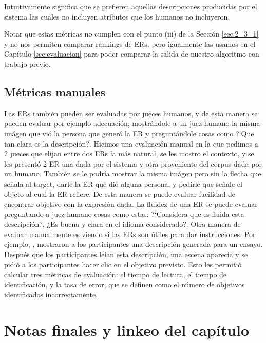 Intuitivamente significa que se prefieren aquellas descripciones producidas por el sistema las cuales no incluyen atributos que los humanos no incluyeron.

Notar que estas m\'etricas no cumplen con el punto (iii) de la Secci\'on \ref{sec:2_3_1} y no nos permiten comparar rankings de ERs, pero igualmente las usamos en el Cap\'itulo \ref{sec:evaluacion} para poder comparar la salida de nuestro algoritmo con trabajo previo.

\subsection{M\'etricas manuales}

Las ERs tambi\'en pueden ser evaluadas por jueces humanos, y de esta manera se pueden evaluar por ejemplo adecuaci\'on, mostr\'andole a un juez humano la misma im\'agen que vi\'o la persona que gener\'o la ER y pregunt\'andole cosas como ?`Que tan clara es la descripci\'on?.
Hicimos una evaluaci\'on manual en la que pedimos a 2 jueces que elijan entre dos ERs la m\'as natural, se les mostro el contexto, y se les present\'o 2 ER una dada por el sistema y otra proveniente del corpus dada por un humano. Tambi\'en se le podr\'ia mostrar la misma im\'agen pero sin la flecha que se\~nala al target, darle la ER que di\'o alguna persona, y pedirle que se\~nale el objeto al cual la ER refiere. De esta manera se puede evaluar facilidad de encontrar objetivo con la expresi\'on dada.
La fluidez de una ER se puede evaluar preguntando a juez humano cosas como estas: 
?`Considera que es fluida esta descripci\'on?, ¿Es buena y clara en el idioma considerado?. 
Otra manera de evaluar manualmente es viendo si las ERs son \'utiles para dar instrucciones. Por ejemplo, \cite{BelzGattEvaluation}, mostraron a los participantes una descripci\'on generada para un ensayo. Despu\'es que los participantes le\'ian esta descripci\'on, una escena aparec\'ia y se pidi\'o a los participantes
hacer clic en el objetivo previsto. Esto les permiti\'o calcular tres m\'etricas de evaluaci\'on: %
el tiempo de lectura, el tiempo de identificaci\'on, y la tasa de error, que se definen como el n\'umero de objetivos identificados incorrectamente.


\section{Notas finales y linkeo del cap\'itulo}
\label{sec:linkeo2}

